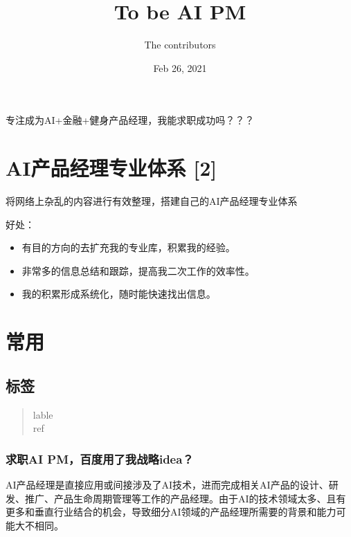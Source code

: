 \documentclass[letterpaper,11pt,english]{sphinxmanual}
\title{To be AI PM}
\date{Feb 26, 2021}
\author{The contributors}
\begin{document}
\pagestyle{empty}
\sphinxmaketitle
\pagestyle{plain}
\sphinxtableofcontents
\pagestyle{normal}
\label{\detokenize{index::doc}}


专注成为AI+金融+健身产品经理，我能求职成功吗？？？


\chapter{AI产品经理专业体系 {[}2{]}}
\label{\detokenize{index:ai-2}}
将网络上杂乱的内容进行有效整理，搭建自己的AI产品经理专业体系

好处：
\begin{itemize}
\item {} 
有目的方向的去扩充我的专业库，积累我的经验。

\item {} 
非常多的信息总结和跟踪，提高我二次工作的效率性。

\item {} 
我的积累形成系统化，随时能快速找出信息。

\end{itemize}


\chapter{常用}
\label{\detokenize{index:id1}}

\section{标签}
\label{\detokenize{index:id2}}\begin{quote}\begin{description}
\item[{lable}] \leavevmode
\item[{ref}] \leavevmode
\end{description}\end{quote}


\subsection{求职AI PM，百度用了我战略idea？}
\label{\detokenize{get_started:ai-pm-idea}}\label{\detokenize{get_started::doc}}
AI产品经理是直接应用或间接涉及了AI技术，进而完成相关AI产品的设计、研发、推广、产品生命周期管理等工作的产品经理。由于AI的技术领域太多、且有更多和垂直行业结合的机会，导致细分AI领域的产品经理所需要的背景和能力可能大不相同。%
\begin{footnote}[1]\sphinxAtStartFootnote
{}
%
\end{footnote}
\end{document}
